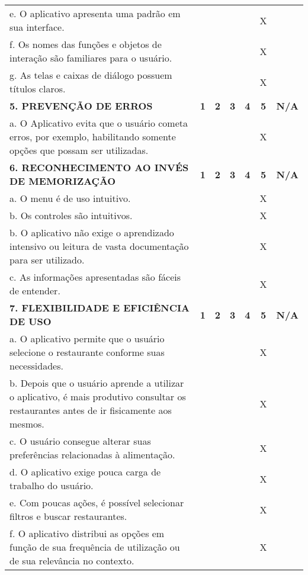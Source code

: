 \documentclass[portuguese,oneside]{tcc}
\begin{document}
\begin{table}[h]
{\begin{tabu}{|L{25em}|c|c|c|c|c|c|}
				e. O aplicativo apresenta uma padrão em sua interface. & & & & & X & \\ 
				f. Os nomes das funções e objetos de interação são familiares para o usuário. & & & & & X & \\ 
				g. As telas e caixas de diálogo possuem títulos claros. & & & & & X & \\ 
				\textbf{5. PREVENÇÃO DE ERROS} & \textbf{1} & \textbf{2} & \textbf{3} & \textbf{4} & \textbf{5} & \textbf{N/A} \\ 
				a. O Aplicativo evita que o usuário cometa erros, por exemplo, habilitando somente opções que possam ser utilizadas. & & & & & X & \\ 
				\textbf{6. RECONHECIMENTO AO INVÉS DE MEMORIZAÇÃO} & \textbf{1} & \textbf{2} & \textbf{3} & \textbf{4} & \textbf{5} & \textbf{N/A} \\ 
				a. O  menu é de uso intuitivo. & & & & & X & \\ 
				b. Os controles são intuitivos. & & & & & X & \\ 
				b. O aplicativo não exige o aprendizado intensivo ou leitura de vasta documentação para ser utilizado. & & & & & X & \\ 
				c. As informações apresentadas são fáceis de entender. & & & & & X & \\ 
				\textbf{7. FLEXIBILIDADE E EFICIÊNCIA DE USO} & \textbf{1} & \textbf{2} & \textbf{3} & \textbf{4} & \textbf{5} & \textbf{N/A} \\ 
				a. O aplicativo permite que o usuário selecione o restaurante conforme suas necessidades. & & & & & X & \\ 
				b. Depois que o usuário aprende a utilizar o aplicativo, é mais produtivo consultar os restaurantes antes de ir fisicamente aos mesmos. & & & & & X & \\ 
				c. O usuário consegue alterar suas preferências relacionadas à alimentação. & & & & & X & \\ 
				d. O aplicativo exige pouca carga de trabalho do usuário. & & & & & X & \\ 
				e. Com poucas ações, é possível selecionar filtros e buscar restaurantes. & & & & & X & \\ 
				f. O aplicativo distribui as opções em função de sua frequência de utilização ou de sua relevância no contexto.	& & & & & X & \\ 

\end{tabu}}
\end{table}
\end{document}
